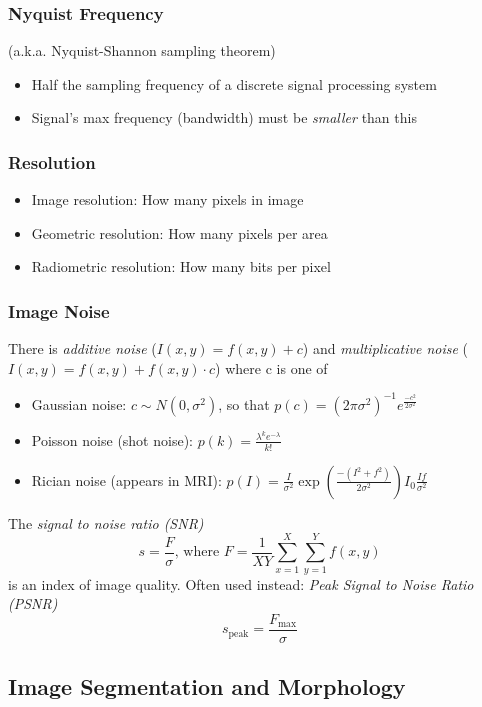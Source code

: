 \documentclass[a4paper,10pt]{article}
\begin{document}
\subsubsection{Nyquist Frequency}
(a.k.a. Nyquist-Shannon sampling theorem)
\begin{itemize}
    \item Half the sampling frequency of a discrete signal processing system
    \item Signal's max frequency (bandwidth) must be \emph{smaller} than this
\end{itemize}

\subsubsection{Resolution}
\begin{itemize}
    \item Image resolution: How many pixels in image
    \item Geometric resolution: How many pixels per area
    \item Radiometric resolution: How many bits per pixel
\end{itemize}

\subsubsection{Image Noise}
There is \emph{additive noise} (\(I(x, y) = f(x, y) + c\)) and \emph{multiplicative noise} (\(I(x, y) = f(x, y) + f(x, y) \cdot c\)) where c is one of
\begin{itemize}
    \item Gaussian noise: \(c \sim N(0, \sigma^2)\), so that \(p(c) = (2 \pi \sigma^2)^{-1} e^\frac{-c^2}{2 \sigma^2}\)
    \item Poisson noise (shot noise): \(p(k) = \frac{\lambda^k e^{-\lambda}}{k!}\)
    \item Rician noise (appears in MRI): \(p(I) = \frac{I}{\sigma^2} \exp{\left(\frac{-(I^2 + f^2)}{2 \sigma^2}\right)} I_0 \frac{If}{\sigma^2}\)
\end{itemize}
The \emph{signal to noise ratio (SNR)} \[s = \frac{F}{\sigma} \text{, where } F = \frac{1}{XY} \sum_{x = 1}^X \sum_{y = 1}^Y f(x, y)\] is an index of image quality. Often used instead: \emph{Peak Signal to Noise Ratio (PSNR)} \[s_\text{peak} = \frac{F_\text{max}}{\sigma}\]

\subsection{Image Segmentation and Morphology}
\end{document}

